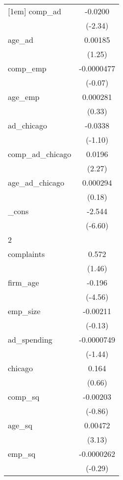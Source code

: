 {\begin{tabular}{l*{1}{c}}
[1em]
comp\_ad     &     -0.0200\sym{*}  \\
            &     (-2.34)         \\
[1em]
age\_ad      &     0.00185         \\
            &      (1.25)         \\
[1em]
comp\_emp    &  -0.0000477         \\
            &     (-0.07)         \\
[1em]
age\_emp     &    0.000281         \\
            &      (0.33)         \\
[1em]
ad\_chicago  &     -0.0338         \\
            &     (-1.10)         \\
[1em]
comp\_ad\_chicago&      0.0196\sym{*}  \\
            &      (2.27)         \\
[1em]
age\_ad\_chicago&    0.000294         \\
            &      (0.18)         \\
[1em]
\_cons      &      -2.544\sym{***}\\
            &     (-6.60)         \\
\hline
2           &                     \\
complaints  &       0.572         \\
            &      (1.46)         \\
[1em]
firm\_age    &      -0.196\sym{***}\\
            &     (-4.56)         \\
[1em]
emp\_size    &    -0.00211         \\
            &     (-0.13)         \\
[1em]
ad\_spending &  -0.0000749         \\
            &     (-1.44)         \\
[1em]
chicago     &       0.164         \\
            &      (0.66)         \\
[1em]
comp\_sq     &    -0.00203         \\
            &     (-0.86)         \\
[1em]
age\_sq      &     0.00472\sym{**} \\
            &      (3.13)         \\
[1em]
emp\_sq      &  -0.0000262         \\
            &     (-0.29)         \\

\end{tabular}}
